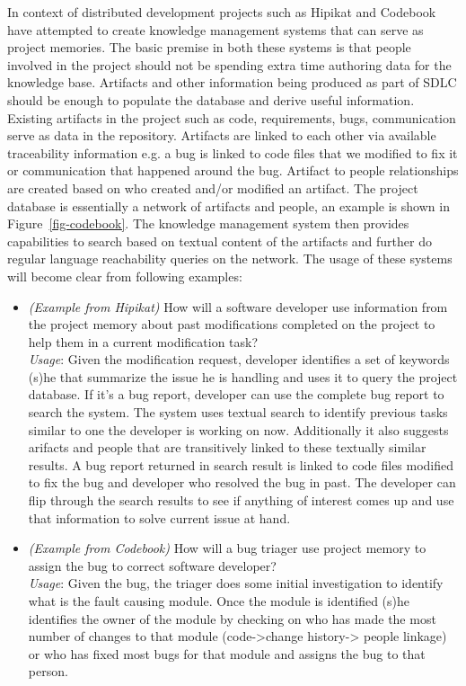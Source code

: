 In context of distributed development projects such as Hipikat\cite{} and Codebook\cite{} have attempted to create knowledge management systems that can serve as project memories. The basic premise in both these systems is that people involved in the project should not be spending extra time authoring data for the knowledge base. Artifacts and other information being produced as part of SDLC should be enough to populate the database and derive useful information. Existing artifacts in the project such as code, requirements, bugs, communication serve as data in the repository. Artifacts are linked to each other via available traceability information e.g. a bug is linked to code files that we modified to fix it or communication that happened around the bug. Artifact to people relationships are created based on who created and/or modified an artifact. The project database is essentially a network of artifacts and people, an example is shown in Figure~\ref{fig-codebook}. The knowledge management system then provides capabilities to search based on textual content of the artifacts and further do regular language reachability queries on the network. The usage of these systems will become clear from following examples:
\begin{itemize}
\item \textit{(Example from Hipikat)} How will a software developer use information from the project memory about past modifications completed on the project to help them in a current modification task? \\\textit{Usage}: Given the modification request, developer identifies a set of keywords (s)he that summarize the issue he is handling and uses it to query the project database. If it's a bug report, developer can use the complete bug report to search the system. The system uses textual search to identify previous tasks similar to one the developer is working on now. Additionally it also suggests arifacts and people that are transitively linked to these textually similar results. A bug report returned in search result is linked to code files modified to fix the bug and developer who resolved the bug in past. The developer can flip through the search results to see if anything of interest comes up and use that information to solve current issue at hand. 
\item \textit{(Example from Codebook)} How will a bug triager use project memory to assign the bug to correct software developer? \\
\textit{Usage}: Given the bug, the triager does some initial investigation to identify what is the fault causing module. Once the module is identified (s)he identifies the owner of the module by checking on who has made the most number of changes to that module (code->change history-> people linkage) or who has fixed most bugs for that module and assigns the bug to that person.
\end{itemize} 

